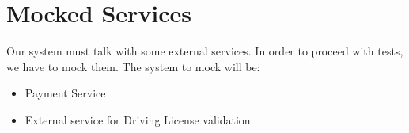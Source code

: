 \section{Mocked Services}
Our system must talk with some external services. In order to proceed with tests, we have to mock them. The system to mock will be:
\begin{itemize}
\item Payment Service
\item External service for Driving License validation
\end{itemize}